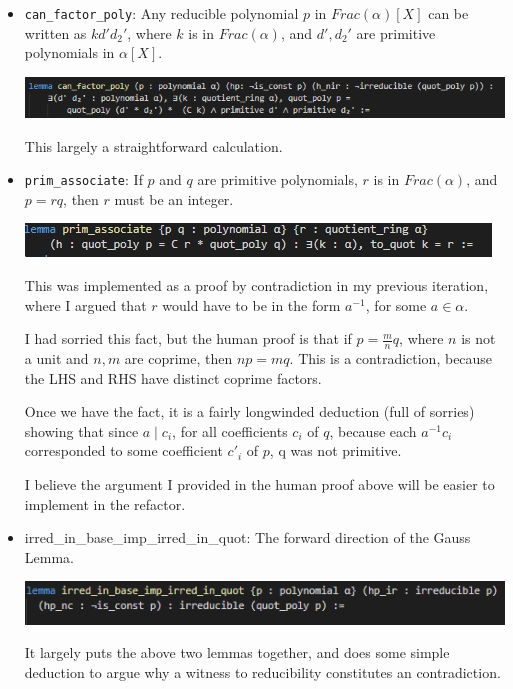 \documentclass[pagesize=a4]{scrreprt}
\begin{document}
\begin{itemize}
    \item \texttt{can\_factor\_poly}: Any reducible polynomial $p$ in $Frac(\alpha)[X]$ can be written as $kd'd_2'$, where $k$ is in $Frac(\alpha)$, and $d', d_2'$ are primitive polynomials in $ \alpha[X]$. 
    
        \includegraphics[width=\textwidth]{can_factor_poly.png}

    This largely a straightforward calculation. 

    \item \texttt{prim\_associate}: If $p$ and $q$ are primitive polynomials, $r$ is in $Frac(\alpha)$, and $p = rq$, then $r$ must be an integer. 
    
    \includegraphics{prim_associate.png}

    This was implemented as a proof by contradiction in my previous iteration, where I argued that $r$ would have to be in the form $a^{-1}$, for some $a \in \alpha$. 
    
    I had sorried this fact, but the human proof is that if $p = \frac{m}{n}q$, where $n$ is not a unit and $n, m$ are coprime, then $np = mq$. This is a contradiction, because the LHS and RHS have distinct coprime factors. 

    Once we have the fact, it is a fairly longwinded deduction (full of sorries) showing that since $a \mid c_i$, for all coefficients $c_i$ of $q$, because each $a^{-1}c_i$ corresponded to some coefficient $c'_i$ of $p$, q was not primitive. 

    I believe the argument I provided in the human proof above will be easier to implement in the refactor. 

     \item{irred\_in\_base\_imp\_irred\_in\_quot}: The forward direction of the Gauss Lemma. 
    
    \includegraphics{prod_base.png}

    It largely puts the above two lemmas together, and does some simple deduction to argue why a witness to reducibility constitutes an contradiction. 

\end{itemize}
\end{document}
